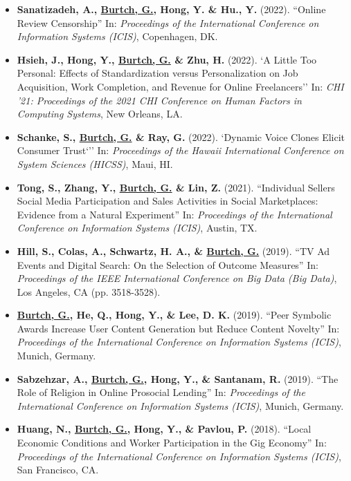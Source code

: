 \documentclass[10.5pt,letterpaper,sans]{moderncv}        %
\begin{document}
\begin{itemize}

\item \textbf{Sanatizadeh, A., \underline{Burtch, G.}, Hong, Y. \& Hu., Y.} (2022). ``Online Review Censorship'' In: \textit{Proceedings of the International Conference on Information Systems (ICIS)}, Copenhagen, DK.

\item \textbf{Hsieh, J., Hong, Y., \underline{Burtch, G.} \& Zhu, H.} (2022). `A Little Too Personal: Effects of Standardization versus Personalization on Job Acquisition, Work Completion, and Revenue for Online Freelancers'' In: \textit{CHI '21: Proceedings of the 2021 CHI Conference on Human Factors in Computing Systems}, New Orleans, LA.

\item \textbf{Schanke, S., \underline{Burtch, G.} \& Ray, G.} (2022). `Dynamic Voice Clones Elicit Consumer Trust`'' In: \textit{Proceedings of the Hawaii International Conference on System Sciences (HICSS)}, Maui, HI.

\item \textbf{Tong, S., Zhang, Y., \underline{Burtch, G.} \& Lin, Z.} (2021). ``Individual Sellers Social Media Participation and Sales Activities in Social Marketplaces: Evidence from a Natural Experiment'' In: \textit{Proceedings of the International Conference on Information Systems (ICIS)}, Austin, TX.

\item \textbf{Hill, S., Colas, A., Schwartz, H. A., \& \underline{Burtch, G.}} (2019). ``TV Ad Events and Digital Search: On the Selection of Outcome Measures'' In: \textit{Proceedings of the IEEE International Conference on Big Data (Big Data)}, Los Angeles, CA (pp. 3518-3528).

\item \textbf{\underline{Burtch, G.}, He, Q., Hong, Y., \& Lee, D. K.} (2019). ``Peer Symbolic Awards Increase User Content Generation but Reduce Content Novelty'' In: \textit{Proceedings of the International Conference on Information Systems (ICIS)}, Munich, Germany.

\item \textbf{Sabzehzar, A., \underline{Burtch, G.}, Hong, Y., \& Santanam, R.} (2019). ``The Role of Religion in Online Prosocial Lending'' In: \textit{Proceedings of the International Conference on Information Systems (ICIS)}, Munich, Germany.

\item \textbf{Huang, N., \underline{Burtch, G.}, Hong, Y., \& Pavlou, P.} (2018). ``Local Economic Conditions and Worker Participation in the Gig Economy'' In: \textit{Proceedings of the International Conference on Information Systems (ICIS)}, San Francisco, CA.


\end{itemize}
\end{document}
